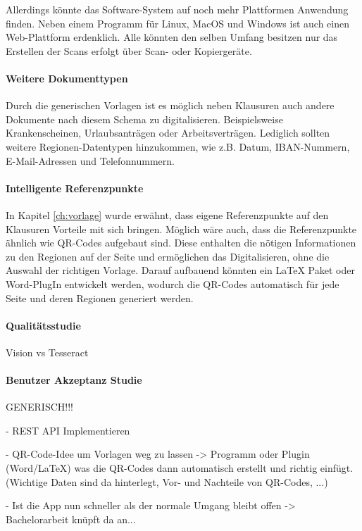 \documentclass[nomenclature, oneside, 150]{HSMW-Thesis}
\begin{document}
	Allerdings könnte das Software-System auf noch mehr Plattformen Anwendung finden. Neben einem Programm für Linux, MacOS und Windows ist auch einen Web-Plattform  erdenklich. Alle könnten den selben Umfang besitzen nur das Erstellen der Scans erfolgt über Scan- oder Kopiergeräte.
	
	\paragraph{Weitere Dokumenttypen} Durch die generischen Vorlagen ist es möglich neben Klausuren auch andere Dokumente nach diesem Schema zu digitalisieren. Beispielsweise Krankenscheinen, Urlaubsanträgen oder Arbeitsverträgen. Lediglich sollten weitere Regionen-Datentypen hinzukommen, wie z.B. Datum, IBAN-Nummern, E-Mail-Adressen und Telefonnummern.
	
	
	\paragraph{Intelligente Referenzpunkte} In Kapitel \ref{ch:vorlage} wurde erwähnt, dass eigene Referenzpunkte auf den Klausuren Vorteile mit sich bringen. Möglich wäre auch, dass die Referenzpunkte ähnlich wie QR-Codes aufgebaut sind. Diese enthalten die nötigen Informationen zu den Regionen auf der Seite und ermöglichen das Digitalisieren, ohne die Auswahl der richtigen Vorlage. Darauf aufbauend könnten ein \LaTeX \xspace Paket oder Word-PlugIn entwickelt werden, wodurch die QR-Codes automatisch für jede Seite und deren Regionen generiert werden. 
	
	\paragraph{Qualitätsstudie} Vision vs Tesseract
	
	
	\paragraph{Benutzer Akzeptanz Studie}
	
	GENERISCH!!!
	
	- REST API Implementieren
	
	
	- QR-Code-Idee um Vorlagen weg zu lassen -> Programm oder Plugin (Word/LaTeX) was die QR-Codes dann automatisch erstellt und richtig einfügt. (Wichtige Daten sind da hinterlegt, Vor- und Nachteile von QR-Codes, ...)
	
	- Ist die App nun schneller als der normale Umgang bleibt offen -> Bachelorarbeit knüpft da an...
	
\end{document}
